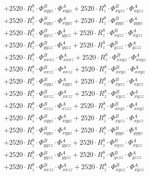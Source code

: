 \documentclass{article}
\begin{document}
\begin{subequations}
\begin{gather}
\begin{array}{c}
 \\[0.2em] 		 + 2520 \cdot R_{z}^{8} \cdot \Phi{}^{B}_{xyyz} \cdot \Phi{}^{A}_{xyyz}+ 2520 \cdot R_{z}^{8} \cdot \Phi{}^{B}_{xyzz} \cdot \Phi{}^{A}_{xyzz} 
 \\[0.2em] 		 + 2520 \cdot R_{z}^{8} \cdot \Phi{}^{B}_{xyyz} \cdot \Phi{}^{A}_{xyyz}+ 2520 \cdot R_{z}^{8} \cdot \Phi{}^{B}_{yyyz} \cdot \Phi{}^{A}_{yyyz} 
 \\[0.2em] 		 + 2520 \cdot R_{z}^{8} \cdot \Phi{}^{B}_{yyzz} \cdot \Phi{}^{A}_{yyzz}+ 2520 \cdot R_{z}^{8} \cdot \Phi{}^{B}_{xyzz} \cdot \Phi{}^{A}_{xyzz} 
 \\[0.2em] 		 + 2520 \cdot R_{z}^{8} \cdot \Phi{}^{B}_{yyzz} \cdot \Phi{}^{A}_{yyzz}+ 2520 \cdot R_{z}^{8} \cdot \Phi{}^{B}_{yzzz} \cdot \Phi{}^{A}_{yzzz} 
 \\[0.2em] 		 + 2520 \cdot R_{z}^{8} \cdot \Phi{}^{B}_{xxxz} \cdot \Phi{}^{A}_{xxxz}+ 2520 \cdot R_{z}^{8} \cdot \Phi{}^{B}_{xxyz} \cdot \Phi{}^{A}_{xxyz} 
 \\[0.2em] 		 + 2520 \cdot R_{z}^{8} \cdot \Phi{}^{B}_{xxzz} \cdot \Phi{}^{A}_{xxzz}+ 2520 \cdot R_{z}^{8} \cdot \Phi{}^{B}_{xxyz} \cdot \Phi{}^{A}_{xxyz} 
 \\[0.2em] 		 + 2520 \cdot R_{z}^{8} \cdot \Phi{}^{B}_{xyyz} \cdot \Phi{}^{A}_{xyyz}+ 2520 \cdot R_{z}^{8} \cdot \Phi{}^{B}_{xyzz} \cdot \Phi{}^{A}_{xyzz} 
 \\[0.2em] 		 + 2520 \cdot R_{z}^{8} \cdot \Phi{}^{B}_{xxzz} \cdot \Phi{}^{A}_{xxzz}+ 2520 \cdot R_{z}^{8} \cdot \Phi{}^{B}_{xyzz} \cdot \Phi{}^{A}_{xyzz} 
 \\[0.2em] 		 + 2520 \cdot R_{z}^{8} \cdot \Phi{}^{B}_{xzzz} \cdot \Phi{}^{A}_{xzzz}+ 2520 \cdot R_{z}^{8} \cdot \Phi{}^{B}_{xxyz} \cdot \Phi{}^{A}_{xxyz} 
 \\[0.2em] 		 + 2520 \cdot R_{z}^{8} \cdot \Phi{}^{B}_{xyyz} \cdot \Phi{}^{A}_{xyyz}+ 2520 \cdot R_{z}^{8} \cdot \Phi{}^{B}_{xyzz} \cdot \Phi{}^{A}_{xyzz} 
 \\[0.2em] 		 + 2520 \cdot R_{z}^{8} \cdot \Phi{}^{B}_{xyyz} \cdot \Phi{}^{A}_{xyyz}+ 2520 \cdot R_{z}^{8} \cdot \Phi{}^{B}_{yyyz} \cdot \Phi{}^{A}_{yyyz} 
 \\[0.2em] 		 + 2520 \cdot R_{z}^{8} \cdot \Phi{}^{B}_{yyzz} \cdot \Phi{}^{A}_{yyzz}+ 2520 \cdot R_{z}^{8} \cdot \Phi{}^{B}_{xyzz} \cdot \Phi{}^{A}_{xyzz} 
 \\[0.2em] 		 + 2520 \cdot R_{z}^{8} \cdot \Phi{}^{B}_{yyzz} \cdot \Phi{}^{A}_{yyzz}+ 2520 \cdot R_{z}^{8} \cdot \Phi{}^{B}_{yzzz} \cdot \Phi{}^{A}_{yzzz} 
 \\[0.2em] 		 + 2520 \cdot R_{z}^{8} \cdot \Phi{}^{B}_{xxzz} \cdot \Phi{}^{A}_{xxzz}+ 2520 \cdot R_{z}^{8} \cdot \Phi{}^{B}_{xyzz} \cdot \Phi{}^{A}_{xyzz} 

\end{array}
\end{gather}
\end{subequations}
\end{document}
